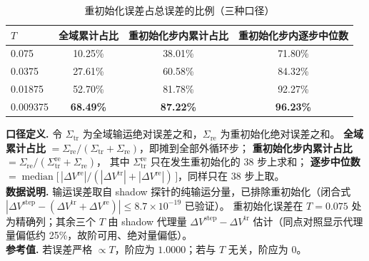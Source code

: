 \documentclass[11pt]{article}
\begin{document}
\vspace{-6pt}
\begin{table}[h]
\centering
\caption{重初始化误差占总误差的比例（三种口径）}
\small
\begin{tabular}{lccc}
\toprule
$T$ & 全域累计占比 & 重初始化步内累计占比 & 重初始化步内逐步中位数 \\
\midrule
0.075    & 10.25\% & 38.01\% & 71.80\% \\
0.0375   & 27.61\% & 60.58\% & 84.32\% \\
0.01875  & 52.70\% & 81.78\% & 92.27\% \\
0.009375 & \textbf{68.49\%} & \textbf{87.22\%} & \textbf{96.23\%} \\
\bottomrule
\end{tabular}
\end{table}

\vspace{-4pt}
{\footnotesize
\textbf{口径定义.} 令 $\Sigma_{\mathrm{tr}}$ 为全域输运绝对误差之和，$\Sigma_{\mathrm{re}}$ 为重初始化绝对误差之和。
\textbf{全域累计占比} $=\Sigma_{\mathrm{re}}/(\Sigma_{\mathrm{tr}}+\Sigma_{\mathrm{re}})$，即摊到全部外循环步；
\textbf{重初始化步内累计占比} $=\Sigma_{\mathrm{re}}/(\Sigma_{\mathrm{tr}}^{\mathrm{re}}+\Sigma_{\mathrm{re}})$，
其中 $\Sigma_{\mathrm{tr}}^{\mathrm{re}}$ 只在发生重初始化的 38 步上求和；
\textbf{逐步中位数} $=\operatorname{median}\bigl[\,|\Delta V^{\mathrm{re}}|/(|\Delta V^{\mathrm{tr}}|+|\Delta V^{\mathrm{re}}|)\,\bigr]$，同样只在 38 步上取。\\[2pt]
\textbf{数据说明.} 输运误差取自 shadow 探针的纯输运分量，已排除重初始化（闭合式
$|\Delta V^{\mathrm{step}}-(\Delta V^{\mathrm{tr}}+\Delta V^{\mathrm{re}})|\le 8.7\times10^{-19}$ 已验证）。
重初始化误差在 $T=0.075$ 处为精确列；其余三个 $T$ 由 shadow 代理量
$\Delta V^{\mathrm{step}}-\Delta V^{\mathrm{tr}}$ 估计（同点对照显示代理量偏低约 25\%，故阶可用、绝对量偏低）。\\[2pt]
\textbf{参考值.} 若误差严格 $\propto T$，阶应为 $1.0000$；若与 $T$ 无关，阶应为 $0$。
}
\end{document}
